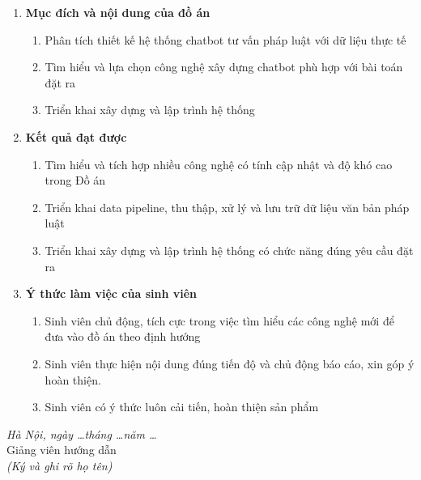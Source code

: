 \begin{enumerate}

\item [{\bfseries 1.}]{\bfseries Mục đích và nội dung của đồ án}

\begin{enumerate}
\item Phân tích thiết kế hệ thống chatbot tư vấn pháp luật với dữ liệu thực tế
\item Tìm hiểu và lựa chọn công nghệ xây dựng chatbot phù hợp với bài toán đặt ra
\item Triển khai xây dựng và lập trình hệ thống
\end{enumerate}

\item [{\bfseries 2.}] {\bfseries Kết quả đạt được}

\begin{enumerate}
\item Tìm hiểu và tích hợp nhiều công nghệ có tính cập nhật và độ khó cao trong Đồ án
\item Triển khai data pipeline, thu thập, xử lý và lưu trữ dữ liệu văn bản pháp luật
\item Triển khai xây dựng và lập trình hệ thống có chức năng đúng yêu cầu đặt ra
\end{enumerate}

\item [{\bfseries 3.}]{\bfseries Ý thức làm việc của sinh viên}

\begin{enumerate}
\item Sinh viên chủ động, tích cực trong việc tìm hiểu các công nghệ mới để đưa vào đồ án theo định hướng
\item Sinh viên thực hiện nội dung đúng tiến độ và chủ động báo cáo, xin góp ý hoàn thiện.
\item Sinh viên có ý thức luôn cải tiến, hoàn thiện sản phẩm
\end{enumerate}
\end{enumerate}
\hspace{0.4\textwidth}
\begin{minipage}{0.5\textwidth}
\noindent\begin{center}
\textit{Hà Nội, ngày \dots tháng \dots năm \dots} \\

Giảng viên hướng dẫn \\
\textit{(Ký và ghi rõ họ tên)} \\
\vspace{2cm}

\end{center}
\end{minipage}

\endgroup

\newpage
